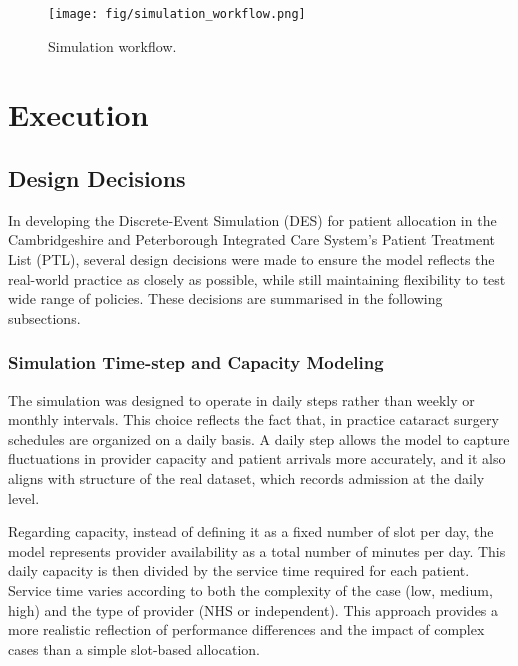 \documentclass[ %
                    author={Nattanan Nawakitbamrung},
                supervisor={Dr. Sébastien Rochat},
                    degree={MSc},
                     title={Developing and Evaluating the Impact of a Single Patient Treatment List (PTL) for an NHS Integrated Care System},
                  subtitle={},
                      type={},
                      year={2025}]{dissertation}
\begin{document}
\begin{figure}[t]
\centering
\texttt{[image: fig/simulation\_workflow.png]}
\caption{Simulation workflow.}
\label{fig:sim-workflow}
\end{figure}

\chapter{Execution}
\label{chap:execution}

\section{Design Decisions}
In developing the Discrete-Event Simulation (DES) for patient allocation in the Cambridgeshire and Peterborough Integrated Care System's Patient Treatment List (PTL), several design decisions were made to ensure the model reflects the real-world practice as closely as possible, while still maintaining flexibility to test wide range of policies. These decisions are summarised in the following subsections.

\subsection{Simulation Time-step and Capacity Modeling}
The simulation was designed to operate in daily steps rather than weekly or monthly intervals. This choice reflects the fact that, in practice cataract surgery schedules are organized on a daily basis. A daily step allows the model to capture fluctuations in provider capacity and patient arrivals more accurately, and it also aligns with structure of the real dataset, which records admission at the daily level.

\vspace{0.2cm}
Regarding capacity, instead of defining it as a fixed number of slot per day, the model represents provider availability as a total number of minutes per day. This daily capacity is then divided by the service time required for each patient. Service time varies according to both the complexity of the case (low, medium, high) and the type of provider (NHS or independent). This approach provides a more realistic reflection of performance differences and the impact of complex cases than a simple slot-based allocation.
\end{document}
